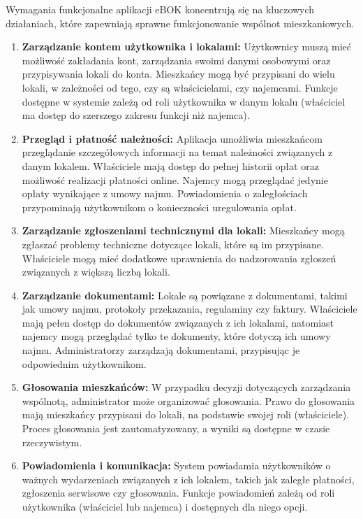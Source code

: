 Wymagania funkcjonalne aplikacji eBOK koncentrują się na kluczowych działaniach, które zapewniają sprawne funkcjonowanie wspólnot mieszkaniowych.

\begin{enumerate}[label=\arabic*.]

    \item \textbf{Zarządzanie kontem użytkownika i lokalami:} Użytkownicy muszą mieć możliwość zakładania kont, zarządzania swoimi danymi osobowymi oraz przypisywania lokali do konta. Mieszkańcy mogą być przypisani do wielu lokali, w zależności od tego, czy są właścicielami, czy najemcami. Funkcje dostępne w systemie zależą od roli użytkownika w danym lokalu (właściciel ma dostęp do szerszego zakresu funkcji niż najemca).

	\item \textbf{Przegląd i płatność należności:} Aplikacja umożliwia mieszkańcom przeglądanie szczegółowych informacji na temat należności związanych z danym lokalem. Właściciele mają dostęp do pełnej historii opłat oraz możliwość realizacji płatności online. Najemcy mogą przeglądać jedynie opłaty wynikające z umowy najmu. Powiadomienia o zaległościach przypominają użytkownikom o konieczności uregulowania opłat.

	\item \textbf{Zarządzanie zgłoszeniami technicznymi dla lokali:} Mieszkańcy mogą zgłaszać problemy techniczne dotyczące lokali, które są im przypisane. Właściciele mogą mieć dodatkowe uprawnienia do nadzorowania zgłoszeń związanych z większą liczbą lokali.

	\item \textbf{Zarządzanie dokumentami:} Lokale są powiązane z dokumentami, takimi jak umowy najmu, protokoły przekazania, regulaminy czy faktury. Właściciele mają pełen dostęp do dokumentów związanych z ich lokalami, natomiast najemcy mogą przeglądać tylko te dokumenty, które dotyczą ich umowy najmu. Administratorzy zarządzają dokumentami, przypisując je odpowiednim użytkownikom.

	\item \textbf{Głosowania mieszkańców:} W przypadku decyzji dotyczących zarządzania wspólnotą, administrator może organizować głosowania. Prawo do głosowania mają mieszkańcy przypisani do lokali, na podstawie swojej roli (właściciele). Proces głosowania jest zautomatyzowany, a wyniki są dostępne w czasie rzeczywistym.

	\item \textbf{Powiadomienia i komunikacja:} System powiadamia użytkowników o ważnych wydarzeniach związanych z ich lokalem, takich jak zaległe płatności, zgłoszenia serwisowe czy głosowania. Funkcje powiadomień zależą od roli użytkownika (właściciel lub najemca) i dostępnych dla niego opcji.


\end{enumerate}

